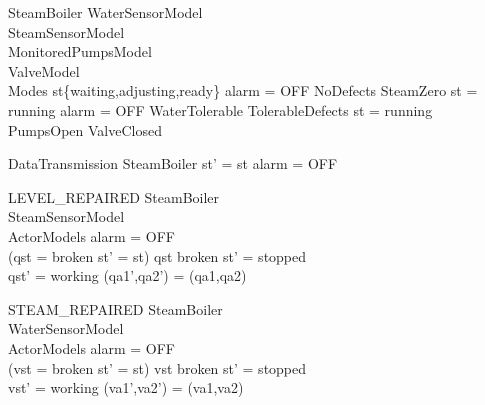  
\begin{schema}{SteamBoiler}
       WaterSensorModel\\
       SteamSensorModel\\
       MonitoredPumpsModel\\
       ValveModel\\
       Modes
\where
       st\in\{waiting,adjusting,ready\} \implies alarm = OFF
                             \implies  NoDefects \land SteamZero            \land
       st = running                 \implies alarm = OFF 
                             \implies WaterTolerable \land TolerableDefects \land
       st = running \lor PumpsOpen    \implies ValveClosed
\end{schema} 


\begin{schema}{DataTransmission}
\Delta SteamBoiler 
\where st' = st \land alarm = OFF 
\end{schema}



\begin{schema}{LEVEL\_REPAIRED}
       \Delta SteamBoiler     \\
       \Xi SteamSensorModel\\
       \Xi ActorModels
\where
       alarm = OFF       \\
       (qst = broken    \land st' = st)       \lor 
       qst \neq broken     \land st' = stopped    \\
       qst' = working   \land (qa1',qa2') = (qa1,qa2) 
 \end{schema}


\begin{schema}{STEAM\_REPAIRED}  
       \Delta SteamBoiler\\
       \Xi WaterSensorModel\\
       \Xi ActorModels
\where
       alarm = OFF      \\
       (vst = broken   \land st' = st)     \lor 
       vst \neq broken    \land st' = stopped  \\
       vst' = working  \land (va1',va2') = (va1,va2) 
\end{schema}


